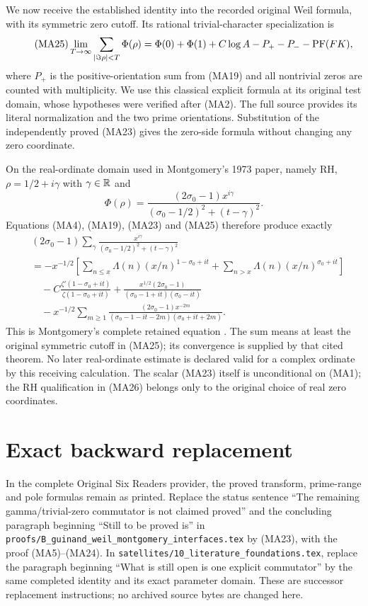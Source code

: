 We now receive the established identity into the recorded original Weil
formula, with its symmetric zero cutoff. Its rational trivial-character
specialization is \cite[formula (11)]{a03ma:Weil}
\begin{equation}\tag{MA25}
 \lim_{T\to\infty}\sum_{|\Im\rho|<T}\Phi(\rho)
 =\Phi(0)+\Phi(1)+C\log A-P_+-P_--\operatorname{PF}(FK),
\end{equation}
where $P_+$ is the positive-orientation sum from (MA19) and all nontrivial
zeros are counted with multiplicity. We use this classical explicit formula
at its original test domain, whose hypotheses were verified after (MA2).
The full source provides its literal normalization and the two prime orientations.
Substitution of the independently proved (MA23) gives the zero-side formula
without changing any zero coordinate.

On the real-ordinate domain used in Montgomery's 1973 paper, namely RH,
$\rho=1/2+i\gamma$ with $\gamma\in\mathbb R$ and
\[
 \Phi(\rho)=\frac{(2\sigma_0-1)x^{i\gamma}}
 { (\sigma_0-1/2)^2+(t-\gamma)^2}.
\]
Equations (MA4), (MA19), (MA23) and (MA25) therefore produce exactly
\begin{equation}\tag{MA26}\begin{aligned}
 &(2\sigma_0-1)\sum_\gamma
 \frac{x^{i\gamma}}{(\sigma_0-1/2)^2+(t-\gamma)^2}\\
 &=-x^{-1/2}\left[
 \sum_{n\le x}\Lambda(n)(x/n)^{1-\sigma_0+it}
 +\sum_{n>x}\Lambda(n)(x/n)^{\sigma_0+it}\right]\\
 &\quad-C\frac{\zeta'(1-\sigma_0+it)}{\zeta(1-\sigma_0+it)}
 +\frac{x^{1/2}(2\sigma_0-1)}{(\sigma_0-1+it)(\sigma_0-it)}\\
 &\quad-x^{-1/2}\sum_{m\ge1}
 \frac{(2\sigma_0-1)x^{-2m}}
 {(\sigma_0-1-it-2m)(\sigma_0+it+2m)}.
\end{aligned}\end{equation}
This is Montgomery's complete retained equation \cite[pp.~185--187]{a03ma:Montgomery}.
The sum means at least the original symmetric cutoff in (MA25); its
convergence is supplied by that cited theorem. No later real-ordinate estimate
is declared valid for a complex ordinate by this receiving calculation.
The scalar (MA23) itself is unconditional on (MA1); the RH qualification in
(MA26) belongs only to the original choice of real zero coordinates.

\section{Exact backward replacement}
In the complete Original Six Readers provider, the proved transform,
prime-range and pole formulas remain as printed. Replace the status sentence
``The remaining gamma/trivial-zero commutator is not claimed proved'' and
the concluding paragraph beginning ``Still to be proved is'' in
\nolinkurl{proofs/B_guinand_weil_montgomery_interfaces.tex} by (MA23),
with the proof (MA5)--(MA24). In
\texttt{satellites/10\_literature\_foundations.tex}, replace the paragraph
beginning ``What is still open is one explicit commutator'' by the same
completed identity and its exact parameter domain. These are successor
replacement instructions; no archived source bytes are changed here.

